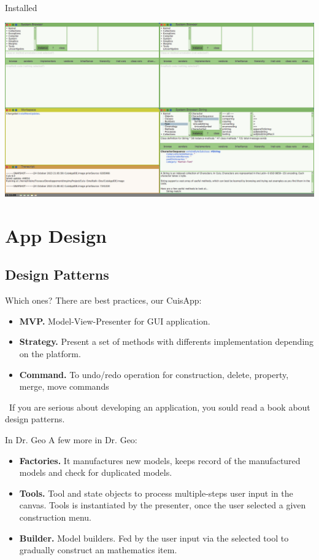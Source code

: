 \documentclass{beamer}
\newcommand{\tip}{\boldmath{\textcolor{red}{$\Rightarrow$}}}
\begin{document}
%
\begin{frame}{Installed}
  \begin{center}
    \includegraphics[width=\textwidth]{CuisAppIDE.png}
  \end{center}
\end{frame}
\section{App Design}
\subsection{Design Patterns}
\begin{frame}{Which ones?}
  There are best practices, our CuisApp:
  \begin{itemize}
  \item \textbf{MVP.} Model-View-Presenter for GUI application.
  \item \textbf{Strategy.} Present a set of methods with differents
    implementation depending on the platform.
  \item \textbf{Command.} To undo/redo operation for construction,
    delete, property, merge, move commands
  \end{itemize}

  \tip\ If you are serious about developing an application, you sould
  read a book about design patterns\cite{designPattern}.

\end{frame}
%
\begin{frame}{In Dr. Geo}
  A few more in Dr. Geo:
  \begin{itemize}
  \item \textbf{Factories.} It manufactures new models, keeps record
    of the manufactured models and check for duplicated models.
  \item \textbf{Tools.} Tool and state objects to process
    multiple-steps user input in the canvas. Tools is instantiated by
    the presenter, once the user selected a given construction menu.
  \item \textbf{Builder.} Model builders. Fed by the user input via
    the selected tool to gradually construct an mathematics item.
  \end{itemize}
\end{frame}
\end{document}
